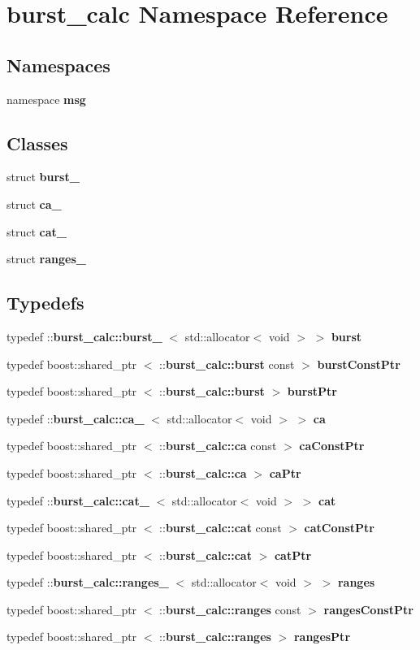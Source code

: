 \section{burst\-\_\-calc \-Namespace \-Reference}
\label{namespaceburst__calc}
\subsection*{\-Namespaces}
\begin{DoxyCompactItemize}
\item 
namespace {\bf msg}
\end{DoxyCompactItemize}
\subsection*{\-Classes}
\begin{DoxyCompactItemize}
\item 
struct {\bf burst\-\_\-}
\item 
struct {\bf ca\-\_\-}
\item 
struct {\bf cat\-\_\-}
\item 
struct {\bf ranges\-\_\-}
\end{DoxyCompactItemize}
\subsection*{\-Typedefs}
\begin{DoxyCompactItemize}
\item 
typedef \-::{\bf burst\-\_\-calc\-::burst\-\_\-}\*
$<$ std\-::allocator$<$ void $>$ $>$ {\bf burst}
\item 
typedef boost\-::shared\-\_\-ptr\*
$<$ \-::{\bf burst\-\_\-calc\-::burst} const  $>$ {\bf burst\-Const\-Ptr}
\item 
typedef boost\-::shared\-\_\-ptr\*
$<$ \-::{\bf burst\-\_\-calc\-::burst} $>$ {\bf burst\-Ptr}
\item 
typedef \-::{\bf burst\-\_\-calc\-::ca\-\_\-}\*
$<$ std\-::allocator$<$ void $>$ $>$ {\bf ca}
\item 
typedef boost\-::shared\-\_\-ptr\*
$<$ \-::{\bf burst\-\_\-calc\-::ca} const  $>$ {\bf ca\-Const\-Ptr}
\item 
typedef boost\-::shared\-\_\-ptr\*
$<$ \-::{\bf burst\-\_\-calc\-::ca} $>$ {\bf ca\-Ptr}
\item 
typedef \-::{\bf burst\-\_\-calc\-::cat\-\_\-}\*
$<$ std\-::allocator$<$ void $>$ $>$ {\bf cat}
\item 
typedef boost\-::shared\-\_\-ptr\*
$<$ \-::{\bf burst\-\_\-calc\-::cat} const  $>$ {\bf cat\-Const\-Ptr}
\item 
typedef boost\-::shared\-\_\-ptr\*
$<$ \-::{\bf burst\-\_\-calc\-::cat} $>$ {\bf cat\-Ptr}
\item 
typedef \-::{\bf burst\-\_\-calc\-::ranges\-\_\-}\*
$<$ std\-::allocator$<$ void $>$ $>$ {\bf ranges}
\item 
typedef boost\-::shared\-\_\-ptr\*
$<$ \-::{\bf burst\-\_\-calc\-::ranges} const  $>$ {\bf ranges\-Const\-Ptr}
\item 
typedef boost\-::shared\-\_\-ptr\*
$<$ \-::{\bf burst\-\_\-calc\-::ranges} $>$ {\bf ranges\-Ptr}
\end{DoxyCompactItemize}

